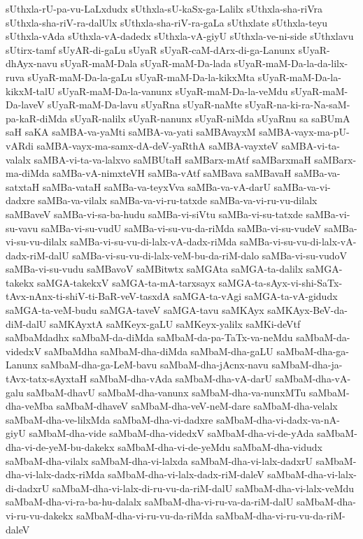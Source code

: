{sUthxla-rU-pa-vu-LaLxdudx
sUthxla-sU-kaSx-ga-Lalilx
sUthxla-sha-riVra
sUthxla-sha-riV-ra-dalUlx
sUthxla-sha-riV-ra-gaLa
sUthxlate
sUthxla-teyu
sUthxla-vAda
sUthxla-vA-dadedx
sUthxla-vA-giyU
sUthxla-ve-ni-side
sUthxlavu
sUtirx-tamf
sUyAR-di-gaLu
sUyaR
sUyaR-caM-dArx-di-ga-Lanunx
sUyaR-dhAyx-navu
sUyaR-maM-Dala
sUyaR-maM-Da-lada
sUyaR-maM-Da-la-da-lilx-ruva
sUyaR-maM-Da-la-gaLu
sUyaR-maM-Da-la-kikxMta
sUyaR-maM-Da-la-kikxM-talU
sUyaR-maM-Da-la-vanunx
sUyaR-maM-Da-la-veMdu
sUyaR-maM-Da-laveV
sUyaR-maM-Da-lavu
sUyaRna
sUyaR-naMte
sUyaR-na-ki-ra-Na-saM-pa-kaR-diMda
sUyaR-nalilx
sUyaR-nanunx
sUyaR-niMda
sUyaRnu
sa
saBUmA
saH
saKA
saMBA-va-yaMti
saMBA-va-yati
saMBAvayxM
saMBA-vayx-ma-pU-vARdi
saMBA-vayx-ma-samx-dA-deV-yaRthA
saMBA-vayxteV
saMBA-vi-ta-valalx
saMBA-vi-ta-va-lalxvo
saMBUtaH
saMBarx-mAtf
saMBarxmaH
saMBarx-ma-diMda
saMBa-vA-nimxteVH
saMBa-vAtf
saMBava
saMBavaH
saMBa-va-satxtaH
saMBa-vataH
saMBa-va-teyxVva
saMBa-va-vA-darU
saMBa-va-vi-dadxre
saMBa-va-vilalx
saMBa-va-vi-ru-tatxde
saMBa-va-vi-ru-vu-dilalx
saMBaveV
saMBa-vi-sa-ba-hudu
saMBa-vi-siVtu
saMBa-vi-su-tatxde
saMBa-vi-su-vavu
saMBa-vi-su-vudU
saMBa-vi-su-vu-da-riMda
saMBa-vi-su-vudeV
saMBa-vi-su-vu-dilalx
saMBa-vi-su-vu-di-lalx-vA-dadx-riMda
saMBa-vi-su-vu-di-lalx-vA-dadx-riM-dalU
saMBa-vi-su-vu-di-lalx-veM-bu-da-riM-dalo
saMBa-vi-su-vudoV
saMBa-vi-su-vudu
saMBavoV
saMBitwtx
saMGAta
saMGA-ta-dalilx
saMGA-takekx
saMGA-takekxV
saMGA-ta-mA-tarxsayx
saMGA-ta-sAyx-vi-shi-SaTx-tAvx-nAnx-ti-shiV-ti-BaR-veV-tasxdA
saMGA-ta-vAgi
saMGA-ta-vA-gidudx
saMGA-ta-veM-budu
saMGA-taveV
saMGA-tavu
saMKAyx
saMKAyx-BeV-da-diM-dalU
saMKAyxtA
saMKeyx-gaLU
saMKeyx-yalilx
saMKi-deVtf
saMbaMdadhx
saMbaM-da-diMda
saMbaM-da-pa-TaTx-va-neMdu
saMbaM-da-videdxV
saMbaMdha
saMbaM-dha-diMda
saMbaM-dha-gaLU
saMbaM-dha-ga-Lanunx
saMbaM-dha-ga-LeM-bavu
saMbaM-dha-jAcnx-navu
saMbaM-dha-ja-tAvx-tatx-sAyxtaH
saMbaM-dha-vAda
saMbaM-dha-vA-darU
saMbaM-dha-vA-galu
saMbaM-dhavU
saMbaM-dha-vanunx
saMbaM-dha-va-nunxMTu
saMbaM-dha-veMba
saMbaM-dhaveV
saMbaM-dha-veV-neM-dare
saMbaM-dha-velalx
saMbaM-dha-ve-lilxMda
saMbaM-dha-vi-dadxre
saMbaM-dha-vi-dadx-va-nA-giyU
saMbaM-dha-vide
saMbaM-dha-videdxV
saMbaM-dha-vi-de-yAda
saMbaM-dha-vi-de-yeM-bu-dakekx
saMbaM-dha-vi-de-yeMdu
saMbaM-dha-vidudx
saMbaM-dha-vilalx
saMbaM-dha-vi-lalxda
saMbaM-dha-vi-lalx-dadxrU
saMbaM-dha-vi-lalx-dadx-riMda
saMbaM-dha-vi-lalx-dadx-riM-daleV
saMbaM-dha-vi-lalx-di-dadxrU
saMbaM-dha-vi-lalx-di-ru-vu-da-riM-dalU
saMbaM-dha-vi-lalx-veMdu
saMbaM-dha-vi-ra-ba-hu-dalalx
saMbaM-dha-vi-ru-va-da-riM-dalU
saMbaM-dha-vi-ru-vu-dakekx
saMbaM-dha-vi-ru-vu-da-riMda
saMbaM-dha-vi-ru-vu-da-riM-daleV
}
